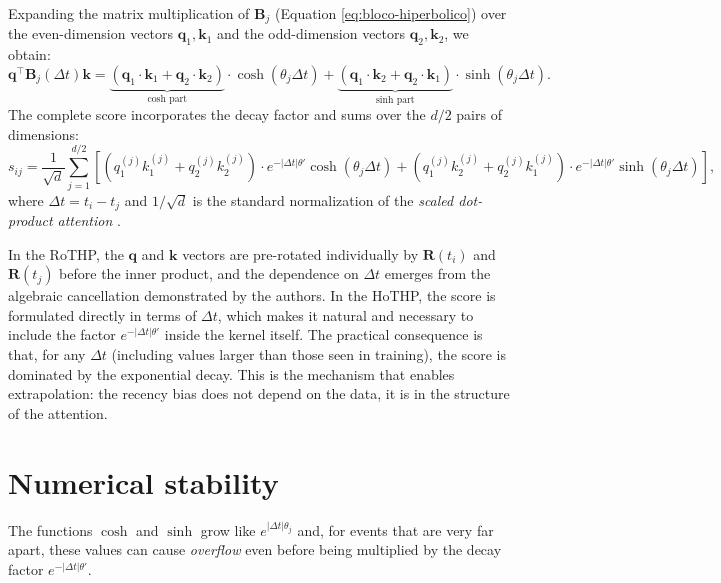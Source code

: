 Expanding the matrix multiplication of $\mathbf{B}_j$ (Equation \ref{eq:bloco-hiperbolico}) over the even-dimension vectors $\mathbf{q}_1, \mathbf{k}_1$ and the odd-dimension vectors $\mathbf{q}_2, \mathbf{k}_2$, we obtain:
%
\begin{equation}
    \mathbf{q}^\top \mathbf{B}_j(\Delta t) \mathbf{k}
    = \underbrace{(\mathbf{q}_1 \cdot \mathbf{k}_1 + \mathbf{q}_2 \cdot \mathbf{k}_2)}_{\text{cosh part}} \cdot \cosh(\theta_j \Delta t)
    + \underbrace{(\mathbf{q}_1 \cdot \mathbf{k}_2 + \mathbf{q}_2 \cdot \mathbf{k}_1)}_{\text{sinh part}} \cdot \sinh(\theta_j \Delta t).
    \label{eq:score-par-dimensoes}
\end{equation}
%
The complete score incorporates the decay factor and sums over the $d/2$ pairs of dimensions:
%
\begin{equation}
    s_{ij} = \frac{1}{\sqrt{d}} \sum_{j=1}^{d/2}
    \left[
        (q_{1}^{(j)} k_{1}^{(j)} + q_{2}^{(j)} k_{2}^{(j)}) \cdot e^{-|\Delta t|\theta'} \cosh(\theta_j \Delta t)
        + (q_{1}^{(j)} k_{2}^{(j)} + q_{2}^{(j)} k_{1}^{(j)}) \cdot e^{-|\Delta t|\theta'} \sinh(\theta_j \Delta t)
    \right],
    \label{eq:score-hothp-completo}
\end{equation}
%
where $\Delta t = t_i - t_j$ and $1/\sqrt{d}$ is the standard normalization of the \textit{scaled dot-product attention} \cite{vaswani_attention_2017}.

In the RoTHP, the $\mathbf{q}$ and $\mathbf{k}$ vectors are pre-rotated individually by $\mathbf{R}(t_i)$ and $\mathbf{R}(t_j)$ before the inner product, and the dependence on $\Delta t$ emerges from the algebraic cancellation demonstrated by the authors. In the HoTHP, the score is formulated directly in terms of $\Delta t$, which makes it natural and necessary to include the factor $e^{-|\Delta t|\theta'}$ inside the kernel itself. The practical consequence is that, for any $\Delta t$ (including values larger than those seen in training), the score is dominated by the exponential decay. This is the mechanism that enables extrapolation: the recency bias does not depend on the data, it is in the structure of the attention.

\section{Numerical stability}
\label{sec:estabilidade-numerica}

The functions $\cosh$ and $\sinh$ grow like $e^{|\Delta t|\theta_j}$ and, for events that are very far apart, these values can cause \textit{overflow} even before being multiplied by the decay factor $e^{-|\Delta t|\theta'}$.

